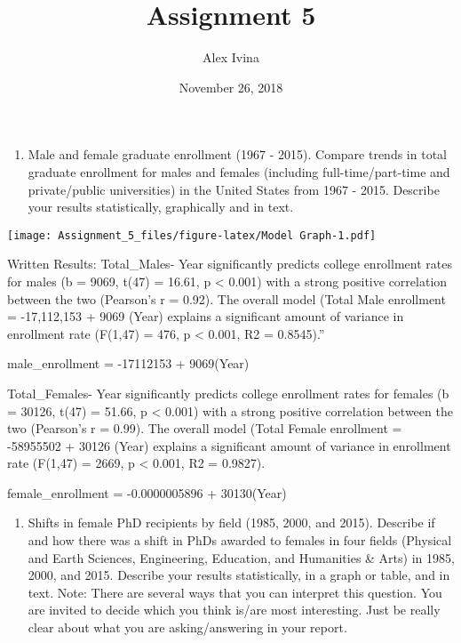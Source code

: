 \documentclass[]{article}
\title{Assignment 5}
\author{Alex Ivina}
\date{November 26, 2018}
\providecommand{\tightlist}{%
  \setlength{\itemsep}{0pt}\setlength{\parskip}{0pt}}
\begin{document}
\maketitle

\begin{enumerate}
\def\labelenumi{\arabic{enumi}.}
\tightlist
\item
  Male and female graduate enrollment (1967 - 2015). Compare trends in
  total graduate enrollment for males and females (including
  full-time/part-time and private/public universities) in the United
  States from 1967 - 2015. Describe your results statistically,
  graphically and in text.
\end{enumerate}

\texttt{[image: Assignment\_5\_files/figure-latex/Model Graph-1.pdf]}

Written Results: Total\_Males- Year significantly predicts college
enrollment rates for males (b = 9069, t(47) = 16.61, p \textless{}
0.001) with a strong positive correlation between the two (Pearson's r =
0.92). The overall model (Total Male enrollment = -17,112,153 + 9069
(Year) explains a significant amount of variance in enrollment rate
(F(1,47) = 476, p \textless{} 0.001, R2 = 0.8545).''

male\_enrollment = -17112153 + 9069(Year)

Total\_Females- Year significantly predicts college enrollment rates for
females (b = 30126, t(47) = 51.66, p \textless{} 0.001) with a strong
positive correlation between the two (Pearson's r = 0.99). The overall
model (Total Female enrollment = -58955502 + 30126 (Year) explains a
significant amount of variance in enrollment rate (F(1,47) = 2669, p
\textless{} 0.001, R2 = 0.9827).

female\_enrollment = -0.0000005896 + 30130(Year)

\begin{enumerate}
\def\labelenumi{\arabic{enumi}.}
\setcounter{enumi}{1}
\tightlist
\item
  Shifts in female PhD recipients by field (1985, 2000, and 2015).
  Describe if and how there was a shift in PhDs awarded to females in
  four fields (Physical and Earth Sciences, Engineering, Education, and
  Humanities \& Arts) in 1985, 2000, and 2015. Describe your results
  statistically, in a graph or table, and in text. Note: There are
  several ways that you can interpret this question. You are invited to
  decide which you think is/are most interesting. Just be really clear
  about what you are asking/answering in your report.
\end{enumerate}
\end{document}
